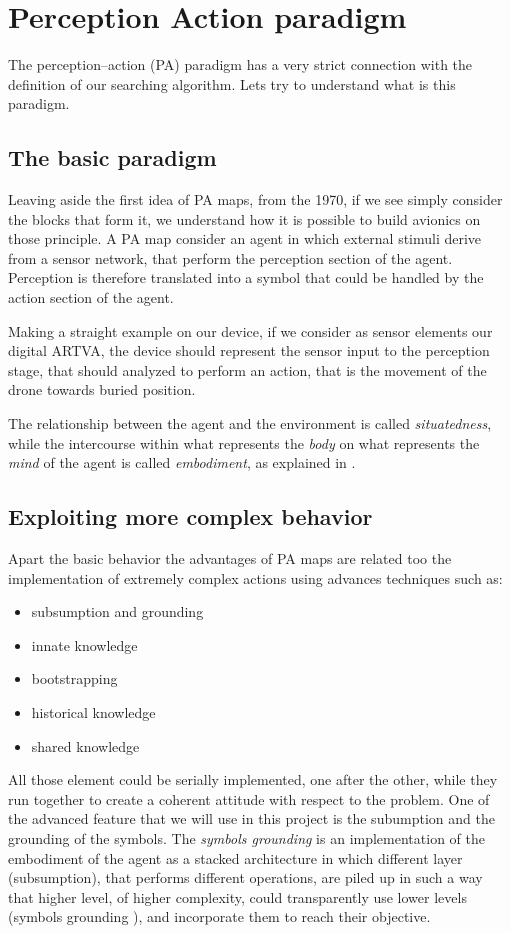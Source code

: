 \section{Perception Action paradigm}
The perception--action (PA) paradigm has a very strict connection with the definition of our searching algorithm. Lets try to understand what is this paradigm.

\subsection{The basic paradigm}
Leaving aside the first idea of PA maps, from the 1970, if we see simply consider the blocks that form it, we understand how it is possible to build avionics on those principle. A PA map consider an agent in which external stimuli derive from a sensor network, that perform the perception section of the agent. Perception is therefore translated into a symbol that could be handled by the action section of the agent.

Making a straight example on our device, if we consider as sensor elements our digital ARTVA, the device should represent the sensor input to the perception stage, that should analyzed to perform an action, that is the movement of the drone towards buried position.

The relationship between the agent and the environment is called \emph{situatedness}, while the intercourse within what represents the \emph{body} on what represents the \emph{mind} of the agent is called \emph{embodiment}, as explained in \citep{thedynamicsofactivecaterogicalperception}.

\subsection{Exploiting more complex behavior}
Apart the basic behavior the advantages of PA maps are related too the implementation of extremely complex actions using advances techniques such as:
\begin{itemize}
\item subsumption and grounding
\item innate knowledge
\item bootstrapping
\item historical knowledge
\item shared knowledge
\end{itemize}
All those element could be serially implemented, one after the other, while they run together to create a coherent attitude with respect to the problem. One of the advanced feature that we will use in this project is the subumption and the grounding of the symbols.
The \emph{symbols grounding} is an implementation of the embodiment of the agent as a stacked architecture in which different layer (subsumption), that performs different operations, are piled up in such a way that higher level, of higher complexity, could transparently use lower levels (symbols grounding \citep{harnad1990symbolgrounding}), and incorporate them to reach their objective.

